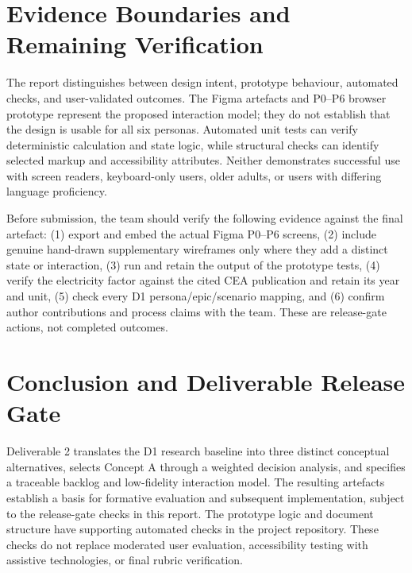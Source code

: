 \documentclass[12pt,a4paper]{article}
\begin{document}
\section{Evidence Boundaries and Remaining Verification}

The report distinguishes between design intent, prototype behaviour, automated checks, and user-validated outcomes. The Figma artefacts and P0--P6 browser prototype represent the proposed interaction model; they do not establish that the design is usable for all six personas. Automated unit tests can verify deterministic calculation and state logic, while structural checks can identify selected markup and accessibility attributes. Neither demonstrates successful use with screen readers, keyboard-only users, older adults, or users with differing language proficiency.

Before submission, the team should verify the following evidence against the final artefact: (1) export and embed the actual Figma P0--P6 screens, (2) include genuine hand-drawn supplementary wireframes only where they add a distinct state or interaction, (3) run and retain the output of the prototype tests, (4) verify the electricity factor against the cited CEA publication and retain its year and unit, (5) check every D1 persona/epic/scenario mapping, and (6) confirm author contributions and process claims with the team. These are release-gate actions, not completed outcomes.

\section{Conclusion and Deliverable Release Gate}

Deliverable 2 translates the D1 research baseline into three distinct conceptual alternatives, selects Concept A through a weighted decision analysis, and specifies a traceable backlog and low-fidelity interaction model. The resulting artefacts establish a basis for formative evaluation and subsequent implementation, subject to the release-gate checks in this report. The prototype logic and document structure have supporting automated checks in the project repository. These checks do not replace moderated user evaluation, accessibility testing with assistive technologies, or final rubric verification.
\end{document}
